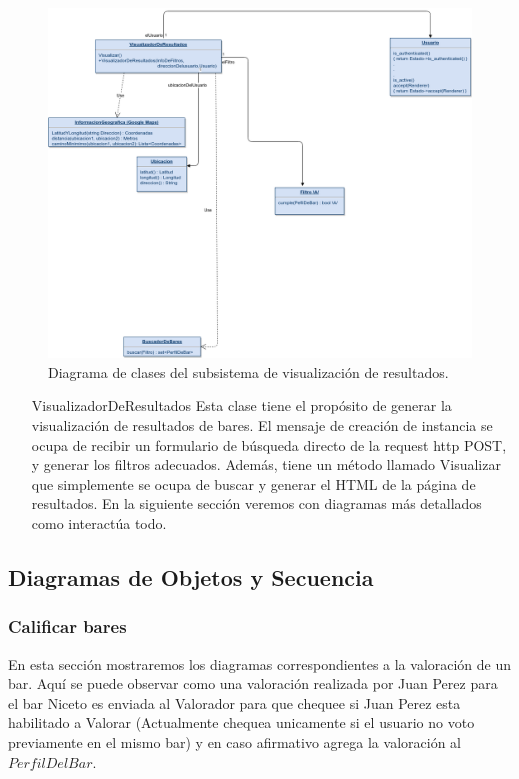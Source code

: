 \begin{figure}[H]
  \centering
  \includegraphics[width=\textwidth]{diagramas/visualizador_clases.png}
  \caption{\normalfont Diagrama de clases del subsistema de visualización de resultados.}
\end{figure}

\begin{itemize}
  \item[\footnotesize{VisualizadorDeResultados}] Esta clase tiene el propósito de generar la visualización de resultados de bares. El mensaje de creación de instancia se ocupa de recibir un formulario de búsqueda directo de la request http POST, y generar los filtros adecuados.
    Además, tiene un m\'etodo llamado Visualizar que simplemente se ocupa de buscar y generar el HTML de la página de resultados. En la siguiente sección veremos con diagramas más detallados como interactúa todo.
\end{itemize}


\subsection{Diagramas de Objetos y Secuencia}

\subsubsection{Calificar bares}

En esta sección mostraremos los diagramas correspondientes a la valoración de un bar. Aquí se puede observar como una valoración realizada por Juan Perez para el bar Niceto es enviada al Valorador para que chequee si Juan Perez esta habilitado a Valorar (Actualmente chequea unicamente si el usuario no voto previamente en el mismo bar) y en caso afirmativo agrega la valoración al $Perfil Del Bar$.

